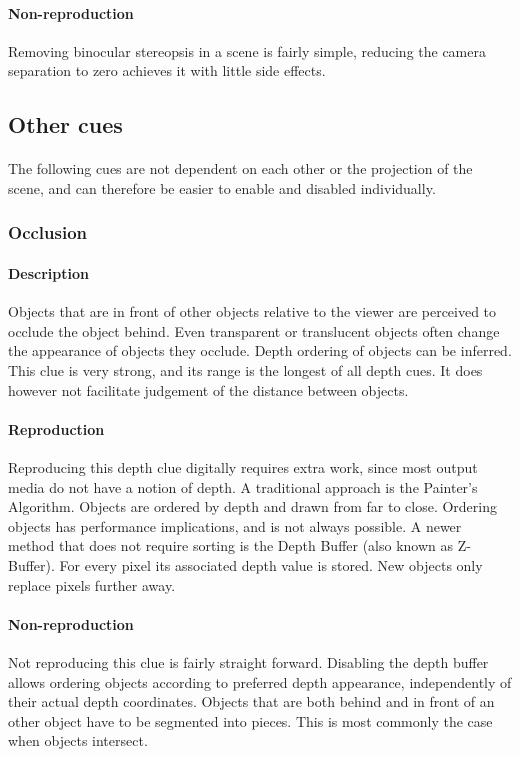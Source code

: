 \paragraph{Non-reproduction}
Removing binocular stereopsis in a scene is fairly simple, reducing the camera separation to zero achieves it with little side effects.


\subsection{Other cues}
\paragraph{}
The following cues are not dependent on each other or the projection of the scene, and can therefore be easier to enable and disabled individually.

\subsubsection{Occlusion}
\paragraph{Description}
Objects that are in front of other objects relative to the viewer are perceived to occlude the object behind.
Even transparent or translucent objects often change the appearance of objects they occlude.
Depth ordering of objects can be inferred.
This clue is very strong, and its range is the longest of all depth cues.
It does however not facilitate judgement of the distance between objects.

\paragraph{Reproduction}
Reproducing this depth clue digitally requires extra work, since most output media do not have a notion of depth. A traditional approach is the Painter's Algorithm\cite{painters}. Objects are ordered by depth and drawn from far to close. Ordering objects has performance implications, and is not always possible.
A newer method that does not require sorting is the Depth Buffer\cite{zbuffer} (also known as Z-Buffer). For every pixel its associated depth value is stored. New objects only replace pixels further away.

\paragraph{Non-reproduction}
Not reproducing this clue is fairly straight forward. Disabling the depth buffer allows ordering objects according to preferred depth appearance, independently of their actual depth coordinates. Objects that are both behind and in front of an other object have to be segmented into pieces. This is most commonly the case when objects intersect.


